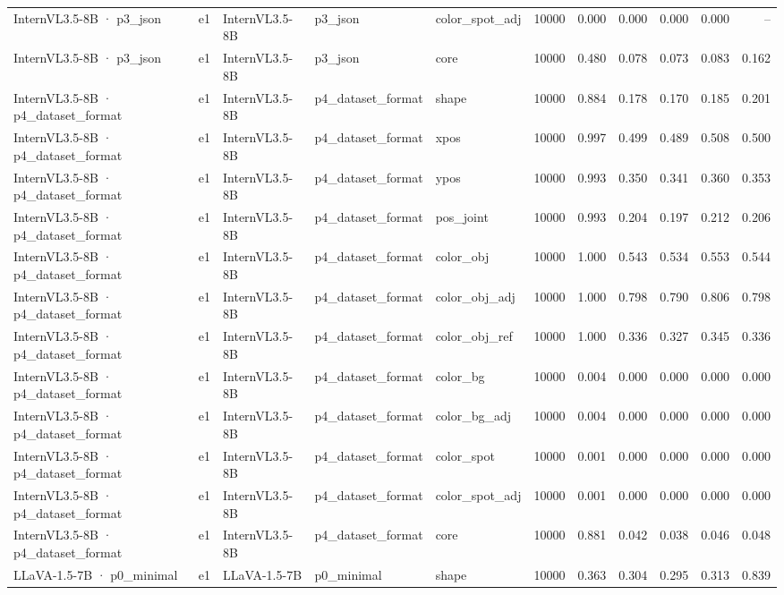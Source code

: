 \begin{tabular}{lllllrrrrrr}
InternVL3.5-8B · p3\_json & e1 & InternVL3.5-8B & p3\_json & color\_spot\_adj & 10000 & 0.000 & 0.000 & 0.000 & 0.000 & -- \\
InternVL3.5-8B · p3\_json & e1 & InternVL3.5-8B & p3\_json & core & 10000 & 0.480 & 0.078 & 0.073 & 0.083 & 0.162 \\
InternVL3.5-8B · p4\_dataset\_format & e1 & InternVL3.5-8B & p4\_dataset\_format & shape & 10000 & 0.884 & 0.178 & 0.170 & 0.185 & 0.201 \\
InternVL3.5-8B · p4\_dataset\_format & e1 & InternVL3.5-8B & p4\_dataset\_format & xpos & 10000 & 0.997 & 0.499 & 0.489 & 0.508 & 0.500 \\
InternVL3.5-8B · p4\_dataset\_format & e1 & InternVL3.5-8B & p4\_dataset\_format & ypos & 10000 & 0.993 & 0.350 & 0.341 & 0.360 & 0.353 \\
InternVL3.5-8B · p4\_dataset\_format & e1 & InternVL3.5-8B & p4\_dataset\_format & pos\_joint & 10000 & 0.993 & 0.204 & 0.197 & 0.212 & 0.206 \\
InternVL3.5-8B · p4\_dataset\_format & e1 & InternVL3.5-8B & p4\_dataset\_format & color\_obj & 10000 & 1.000 & 0.543 & 0.534 & 0.553 & 0.544 \\
InternVL3.5-8B · p4\_dataset\_format & e1 & InternVL3.5-8B & p4\_dataset\_format & color\_obj\_adj & 10000 & 1.000 & 0.798 & 0.790 & 0.806 & 0.798 \\
InternVL3.5-8B · p4\_dataset\_format & e1 & InternVL3.5-8B & p4\_dataset\_format & color\_obj\_ref & 10000 & 1.000 & 0.336 & 0.327 & 0.345 & 0.336 \\
InternVL3.5-8B · p4\_dataset\_format & e1 & InternVL3.5-8B & p4\_dataset\_format & color\_bg & 10000 & 0.004 & 0.000 & 0.000 & 0.000 & 0.000 \\
InternVL3.5-8B · p4\_dataset\_format & e1 & InternVL3.5-8B & p4\_dataset\_format & color\_bg\_adj & 10000 & 0.004 & 0.000 & 0.000 & 0.000 & 0.000 \\
InternVL3.5-8B · p4\_dataset\_format & e1 & InternVL3.5-8B & p4\_dataset\_format & color\_spot & 10000 & 0.001 & 0.000 & 0.000 & 0.000 & 0.000 \\
InternVL3.5-8B · p4\_dataset\_format & e1 & InternVL3.5-8B & p4\_dataset\_format & color\_spot\_adj & 10000 & 0.001 & 0.000 & 0.000 & 0.000 & 0.000 \\
InternVL3.5-8B · p4\_dataset\_format & e1 & InternVL3.5-8B & p4\_dataset\_format & core & 10000 & 0.881 & 0.042 & 0.038 & 0.046 & 0.048 \\
LLaVA-1.5-7B · p0\_minimal & e1 & LLaVA-1.5-7B & p0\_minimal & shape & 10000 & 0.363 & 0.304 & 0.295 & 0.313 & 0.839 \\

\end{tabular}
